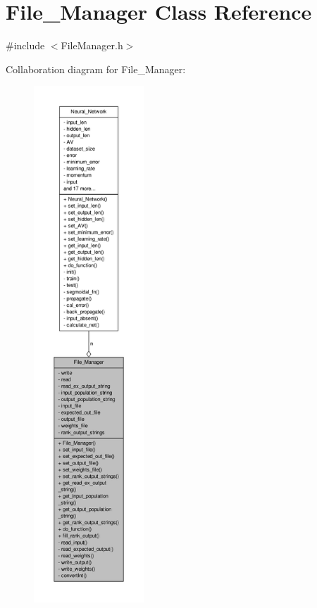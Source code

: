\hypertarget{a00001}{\section{File\-\_\-\-Manager Class Reference}
\label{d8/d84/a00001}
}


{\ttfamily \#include $<$File\-Manager.\-h$>$}



Collaboration diagram for File\-\_\-\-Manager\-:\nopagebreak
\begin{figure}[H]
\begin{center}
\leavevmode
\includegraphics[height=550pt]{d5/db6/a00042}
\end{center}
\end{figure}
